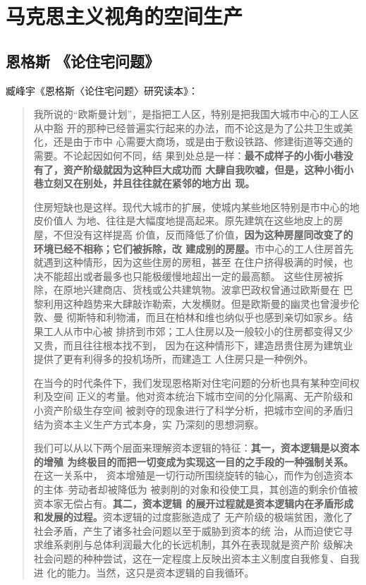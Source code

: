 \chapter{马克思主义视角的空间生产}

\section{恩格斯 《论住宅问题》}

臧峰宇《恩格斯〈论住宅问题〉研究读本》：
\begin{quotation}
  我所说的“欧斯曼计划”，是指把工人区，特别是把我国大城市中心的工人区从中豁
  开的那种已经普遍实行起来的办法，而不论这是为了公共卫生或美化，还是由于市中
  心需要大商场，或是由于敷设铁路、修建街道等交通的需要。不论起因如何不同，结
  果到处总是一样：\textbf{最不成样子的小街小巷没有了，资产阶级就因为这种巨大成功而
    大肆自我吹嘘，但是，这种小街小巷立刻又在别处，并且往往就在紧邻的地方出
    现。}

  住房短缺也是这样。现代大城市的扩展，使城内某些地区特别是市中心的地皮价值人
  为地、往往是大幅度地提高起来。原先建筑在这些地皮上的房屋，不但没有这样提高
  价值，反而降低了价值，\textbf{因为这种房屋同改变了的环境已经不相称；它们被拆除，改
  建成别的房屋。}市中心的工人住房首先就遇到这种情形，因为这些住房的房租，甚至
  在住户挤得极满的时候，也决不能超出或者最多也只能极缓慢地超出一定的最高额。
  这些住房被拆除，在原地兴建商店、货栈或公共建筑物。波拿巴政权曾通过欧斯曼在
  巴黎利用这种趋势来大肆敲诈勒索，大发横财。但是欧斯曼的幽灵也曾漫步伦敦、曼
  彻斯特和利物浦，而且在柏林和维也纳似乎也感到亲切如家乡。结果工人从市中心被
  排挤到市郊；工人住房以及一般较小的住房都变得又少又贵，而且往往根本找不到，
  因为在这种情形下，建造昂贵住房为建筑业提供了更有利得多的投机场所，而建造工
  人住房只是一种例外。

  在当今的时代条件下，我们发现恩格斯对住宅问题的分析也具有某种空间权利及空间
  正义的考量。他对资本统治下城市空间的分化隔离、无产阶级和小资产阶级生存空间
  被剥夺的现象进行了科学分析，把城市空间的矛盾归结为资本主义生产方式本身，实
  乃深刻的思想洞察。

  我们可以从以下两个层面来理解资本逻辑的特征：\textbf{其一，资本逻辑是以资本的增殖
    为终极目的而把一切变成为实现这一目的之手段的一种强制关系。}在这一关系中，
  资本增殖是一切行动所围绕旋转的轴心，而作为创造资本的主体--劳动者却被降低为
  被剥削的对象和役使工具，其创造的剩余价值被资本家无偿占有。\textbf{其二，资本逻辑
    的展开过程就是资本逻辑内在矛盾形成和发展的过程。}资本逻辑的过度膨胀造成了
  无产阶级的极端贫困，激化了社会矛盾，产生了诸多社会问题以至于威胁到资本的统
  治，从而迫使它寻求维系剥削与总体利润最大化的长远机制，其外在表现就是资产阶
  级解决社会问题的种种尝试，这在一定程度上反映出资本主义制度自我修复、自我进
  化的能力。当然，这只是资本逻辑的自我循环。


\end{quotation}
